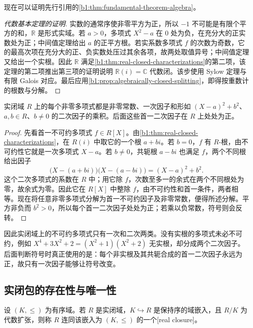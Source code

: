现在可以证明先行引用的\cref{b1:thm:fundamental-theorem-algebra}。
\begin{proof}[代数基本定理的证明]
	实数的通常序使非零平方为正，所以 \(-1\) 不可能是有限个平方的和，\(\mathbb R\) 是形式实域。若 \(a>0\)，多项式 \(X^2-a\) 在 \(0\) 处为负，在充分大的正实数处为正；中间值定理给出 \(a\) 的正平方根。若实系数多项式 \(f\) 的次数为奇数，它的最高次项在充分大的正、负实数处压过其余各项，故两处取值异号；中间值定理又给出一个实根。因此 \(\mathbb R\) 满足\cref{b1:thm:real-closed-characterizations}的第二项，该定理的第二项推出第三项的证明说明 \(\mathbb R(i)=\mathbb C\) 代数闭。该步使用 Sylow 定理与有限 Galois 对应。最后应用\cref{b1:prop:algebraically-closed-splitting}，即得按重数计的根数与分解。
\end{proof}

\begin{corollary}\label{b1:cor:real-polynomial-factorization}
	实闭域 \(R\) 上的每个非零多项式都是非零常数、一次因子和形如 \((X-a)^2+b^2\)、\(a,b\in R\)、\(b\neq0\) 的二次因子的乘积。后面这些首一二次因子在 \(R\) 上处处为正。
\end{corollary}

\begin{proof}
	先看首一不可约多项式 \(f\in R[X]\)。由\cref{b1:thm:real-closed-characterizations}，在 \(R(i)\) 中取它的一个根 \(a+bi\)。若 \(b=0\)，\(f\) 有 \(R\)-根，由不可约性它就是一次多项式 \(X-a\)。若 \(b\ne0\)，共轭根 \(a-bi\) 也满足 \(f\)，两个不同根给出因子
	\[
		\bigl(X-(a+bi)\bigr)\bigl(X-(a-bi)\bigr)=(X-a)^2+b^2.
	\]
	这个二次多项式的系数在 \(R\) 中；用它除 \(f\)，次数至多一的余式在两个不同根处为零，故余式为零。因此它在 \(R[X]\) 中整除 \(f\)，由不可约性和首一条件，两者相等。现在将任意非零多项式分解为首一不可约因子及非零常数，便得所述分解。平方非负而 \(b^2>0\)，所以每个首一二次因子处处为正；若乘以负常数，符号则会反转。
\end{proof}

因此实闭域上的不可约多项式只有一次和二次两类。没有实根的多项式未必不可约，例如 \(X^4+3X^2+2=(X^2+1)(X^2+2)\) 无实根，却分成两个二次因子。后面判断符号时真正使用的是：每个非实根及其共轭合成的首一二次因子永远为正，故只有一次因子能够让符号改变。

\subsection{实闭包的存在性与唯一性}
\label{b1:subsec:E02:02}

\begin{definition}\label{b1:def:real-closure}
	设 \((K,\leq)\) 为有序域。若 \(R\) 是实闭域，\(K\hookrightarrow R\) 是保持序的域嵌入，且 \(R/K\) 为代数扩张，则称 \(R\) 连同该嵌入为 \((K,\leq)\) 的一个[real closure]。
\end{definition}

